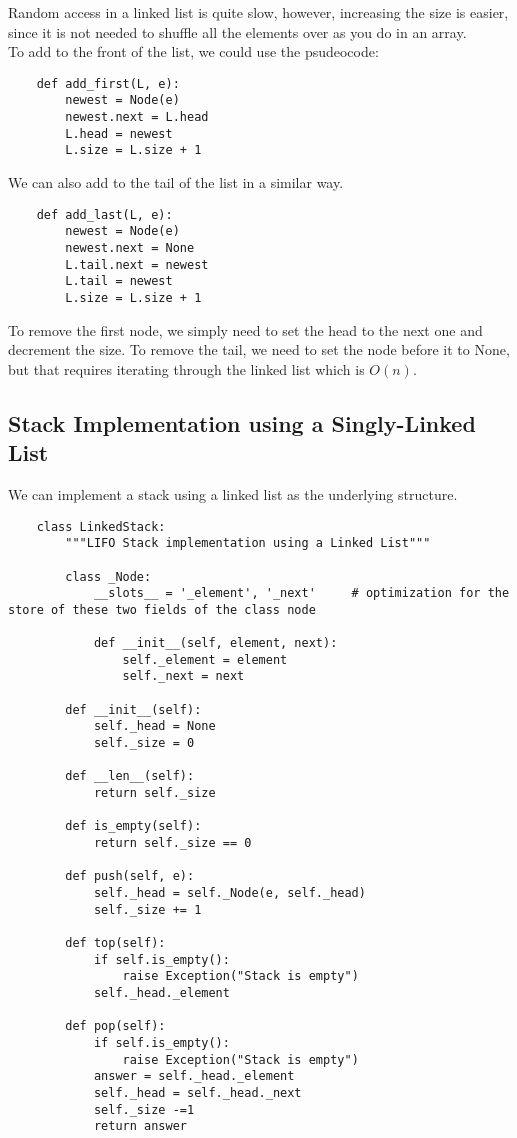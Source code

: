 \documentclass[]{article}
\begin{document}
Random access in a linked list is quite slow, however, increasing the size is easier, since it is not needed to shuffle all the elements over as you do in an array.\\

To add to the front of the list, we could use the psudeocode:

\begin{lstlisting}
	def add_first(L, e):
		newest = Node(e)
		newest.next = L.head
		L.head = newest
		L.size = L.size + 1
\end{lstlisting}\bigbreak

We can also add to the tail of the list in a similar way.

\begin{lstlisting}
	def add_last(L, e):
		newest = Node(e)
		newest.next = None
		L.tail.next = newest
		L.tail = newest
		L.size = L.size + 1
\end{lstlisting}\bigbreak

To remove the first node, we simply need to set the head to the next one and decrement the size. To remove the tail, we need to set the node before it to None, but that requires iterating through the linked list which is $O(n)$. \\

\subsection{Stack Implementation using a Singly-Linked List}\bigbreak

We can implement a stack using a linked list as the underlying structure.

\begin{lstlisting}
	class LinkedStack:
		"""LIFO Stack implementation using a Linked List"""
		
		class _Node:
			__slots__ = '_element', '_next' 	# optimization for the store of these two fields of the class node
			
			def __init__(self, element, next):
				self._element = element
				self._next = next
			
		def __init__(self):
			self._head = None
			self._size = 0
			
		def __len__(self):
			return self._size
		
		def is_empty(self):
			return self._size == 0
			
		def push(self, e):
			self._head = self._Node(e, self._head)
			self._size += 1
			
		def top(self):
			if self.is_empty():
				raise Exception("Stack is empty")
			self._head._element
		
		def pop(self):
			if self.is_empty():
				raise Exception("Stack is empty")
			answer = self._head._element
			self._head = self._head._next
			self._size -=1
			return answer
\end{lstlisting}\bigbreak
\end{document}
